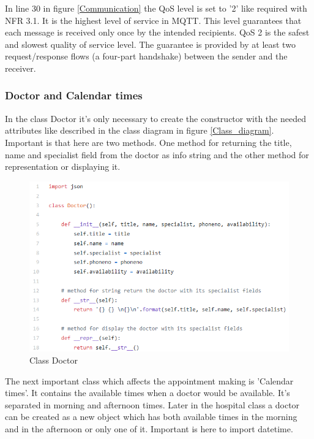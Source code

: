 In line 30 in figure \ref{Communication} the QoS level is set to '2' like required with NFR 3.1. It is the highest level of service in MQTT. This level guarantees that each message is received only once by the intended recipients. QoS 2 is the safest and slowest quality of service level. The guarantee is provided by at least two request/response flows (a four-part handshake) between the sender and the receiver.

\subsubsection{Doctor and Calendar times}
In the class Doctor it's only necessary to create the constructor with the needed attributes like described in the class diagram in figure \ref{Class_diagram}. Important is that here are two methods. One method for returning the title, name and specialist field from the doctor as info string and the other method for representation or displaying it. 

\begin{figure}[H]
\centering
\sidecaption
\includegraphics[scale=.65]{images/melanie_images/Doctor.png}
\caption{Class Doctor}
\label{Doctor}
\end{figure}

The next important class which affects the appointment making is 'Calendar times'. It contains the available times when a doctor would be available. It's separated in morning and afternoon times. Later in the hospital class a doctor can be created as a new object which has both available times in the morning and in the afternoon or only one of it. Important is here to import datetime.


